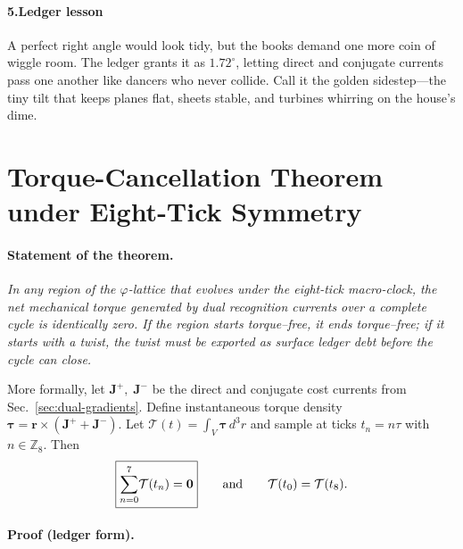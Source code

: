 \documentclass[11pt,oneside]{book}
\begin{document}
\paragraph*{5.\;Ledger lesson}

A perfect right angle would look tidy, but the books demand one more
coin of wiggle room.  
The ledger grants it as $1.72^{\circ}$, letting direct and conjugate
currents pass one another like dancers who never collide.  
Call it the golden sidestep—the tiny tilt that keeps planes flat, sheets
stable, and turbines whirring on the house’s dime.

\section{Torque-Cancellation Theorem under Eight-Tick Symmetry}
\label{sec:torque-cancel}

\paragraph*{Statement of the theorem.}
\emph{In any region of the $\varphi$-lattice that evolves under the
eight-tick macro-clock, the net mechanical torque generated by dual
recognition currents over a complete cycle is identically zero.  If the
region starts torque–free, it ends torque–free; if it starts with a
twist, the twist must be exported as surface ledger debt before the
cycle can close.}

\bigskip
\noindent
More formally, let
$\mathbf J^{\!+},\;\mathbf J^{\!-}$ be the direct and conjugate cost
currents from Sec.~\ref{sec:dual-gradients}.  
Define instantaneous torque density
$\boldsymbol\tau
  = \mathbf r \times (\mathbf J^{\!+}+\mathbf J^{\!-})$.  
Let
\(
  \mathcal T(t)=\int_{V}\boldsymbol\tau\,d^{3}r
\)
and sample at ticks
$t_n = n\tau$ with $n\in\mathbb Z_{8}$.  
Then
\[
  \boxed{%
  \sum_{n=0}^{7}\!\mathcal T(t_n) = \mathbf 0
  }\qquad
  \text{and}
  \qquad
  \mathcal T(t_0)=\mathcal T(t_8).
\]

\paragraph*{Proof (ledger form).}
\end{document}
